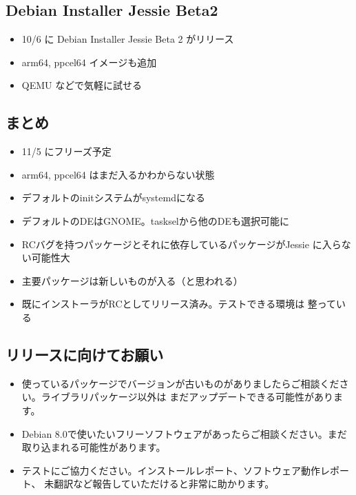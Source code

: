 \documentclass[mingoth,a4paper]{jsarticle}
\begin{document}
\subsection[containsverbatim]{Debian Installer Jessie Beta2}
\begin{itemize}
\item 10/6 に Debian Installer Jessie Beta 2 がリリース
\item arm64, ppcel64 イメージも追加
\item QEMU などで気軽に試せる
\end{itemize}


\subsection{まとめ}
\begin{itemize}
\item 11/5 にフリーズ予定
\item arm64, ppcel64 はまだ入るかわからない状態
\item デフォルトのinitシステムがsystemdになる
\item デフォルトのDEはGNOME。taskselから他のDEも選択可能に
\item RCバグを持つパッケージとそれに依存しているパッケージがJessie
に入らない可能性大
\item 主要パッケージは新しいものが入る（と思われる）
\item 既にインストーラがRCとしてリリース済み。テストできる環境は
整っている
\end{itemize}


\subsection{リリースに向けてお願い}
\begin{itemize}
\item 使っているパッケージでバージョンが古いものがありましたらご相談ください。ライブラリパッケージ以外は
まだアップデートできる可能性があります。
\item Debian 8.0で使いたいフリーソフトウェアがあったらご相談ください。まだ取り込まれる可能性があります。
\item テストにご協力ください。インストールレポート、ソフトウェア動作レポート、
未翻訳など報告していただけると非常に助かります。
\end{itemize}


\end{document}
